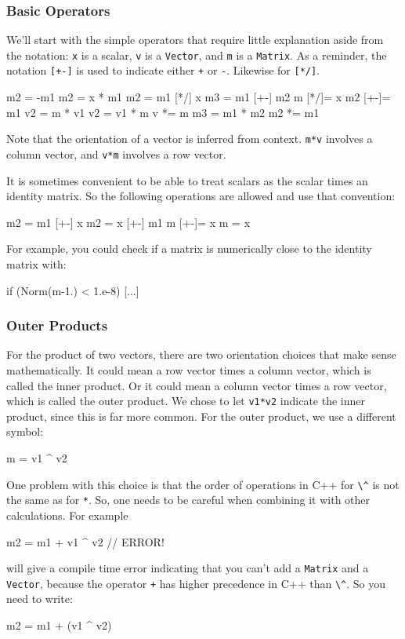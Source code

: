 \documentclass[twoside,letterpaper,11pt]{article}
\renewcommand{\tt}[1]{{\lstinline {#1}}}
\begin{document}
\subsubsection{Basic Operators}

We'll start with the simple operators that require little explanation aside from the 
notation: 
\tt{x} is a scalar, \tt{v} is a \tt{Vector}, and \tt{m} is a \tt{Matrix}.  As a reminder,
the notation \tt{[+-]} is used to indicate either \tt{+} or \tt{-}.  Likewise for \tt{[*/]}.
\begin{tmvcode}
m2 = -m1
m2 = x * m1
m2 = m1 [*/] x
m3 = m1 [+-] m2
m [*/]= x
m2 [+-]= m1
v2 = m * v1
v2 = v1 * m
v *= m
m3 = m1 * m2
m2 *= m1
\end{tmvcode}

Note that the orientation of a vector is inferred from context.  \tt{m*v} involves a 
column vector, and \tt{v*m} involves a row vector.

It is sometimes convenient to be able to treat scalars as the scalar times an
identity matrix.  So the following operations are allowed and use that convention:
\begin{tmvcode}
m2 = m1 [+-] x
m2 = x [+-] m1
m [+-]= x
m = x
\end{tmvcode}
For example, you could check if a matrix is numerically close to the identity matrix 
with:
\begin{tmvcode}
if (Norm(m-1.) < 1.e-8) { [...] }
\end{tmvcode}

\subsubsection{Outer Products}

For the product of two vectors, there are two orientation choices that make sense mathematically.
It could mean a row vector times a column vector, which is called the inner product.
Or it could mean a column vector times a row vector, which is called the outer product.
We chose to let \tt{v1*v2} indicate the inner product, since this is far more common.
For the outer product, we use a different symbol:
\begin{tmvcode}
m = v1 ^ v2
\end{tmvcode}
One problem with this choice is that the order of operations in C++ for \tt{\^} 
is not the same as for \tt{*}.  
So, one needs to be careful when combining it with other calculations.
For example
\begin{tmvcode}
m2 = m1 + v1 ^ v2   // ERROR!
\end{tmvcode}
will give a compile time error indicating that you can't add a 
\tt{Matrix} and a \tt{Vector}, 
because the operator \tt{+} has higher precedence in C++ than \tt{\^}.
So you need to write:
\begin{tmvcode}
m2 = m1 + (v1 ^ v2)
\end{tmvcode}
\end{document}
